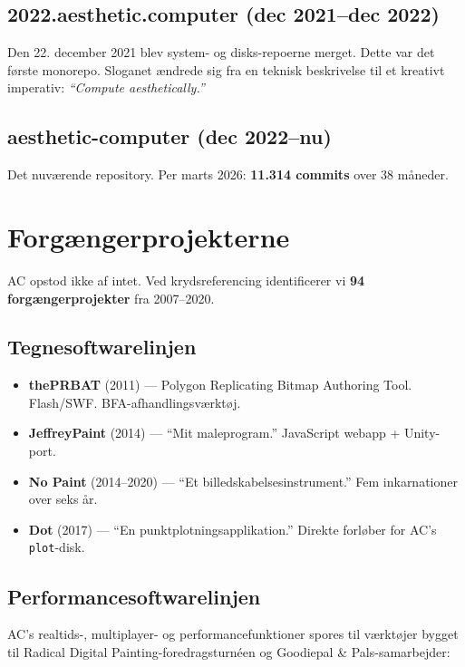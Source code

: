 \documentclass[10pt,letterpaper,twocolumn]{article}
\begin{document}
\subsection{2022.aesthetic.computer (dec 2021--dec 2022)}

Den 22. december 2021 blev system- og disks-repoerne merget. Dette var det første monorepo. Sloganet ændrede sig fra en teknisk beskrivelse til et kreativt imperativ: \emph{``Compute aesthetically.''}

\subsection{aesthetic-computer (dec 2022--nu)}

Det nuværende repository. Per marts 2026: \textbf{11.314 commits} over 38 måneder.

\section{Forgængerprojekterne}

AC opstod ikke af intet. Ved krydsreferencing identificerer vi \textbf{94 forgængerprojekter} fra 2007--2020.

\subsection{Tegnesoftwarelinjen}

\begin{itemize}
  \item \textbf{thePRBAT} (2011) --- Polygon Replicating Bitmap Authoring Tool. Flash/SWF. BFA-afhandlingsværktøj.
  \item \textbf{JeffreyPaint} (2014) --- ``Mit maleprogram.'' JavaScript webapp + Unity-port.
  \item \textbf{No Paint} (2014--2020) --- ``Et billedskabelsesinstrument.'' Fem inkarnationer over seks år.
  \item \textbf{Dot} (2017) --- ``En punktplotningsapplikation.'' Direkte forløber for AC's \texttt{plot}-disk.
\end{itemize}

\subsection{Performancesoftwarelinjen}

AC's realtids-, multiplayer- og performancefunktioner spores til værktøjer bygget til Radical Digital Painting-foredragsturnéen og Goodiepal \& Pals-samarbejder:
\end{document}

